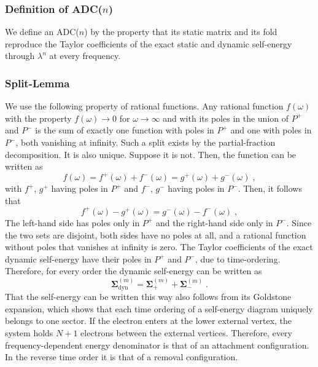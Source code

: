 \documentclass[aip,jcp,reprint,noshowkeys,superscriptaddress]{revtex4-2}
\theoremstyle{plain}
\theoremstyle{definition}
\theoremstyle{remark}
\begin{document}
\subsubsection{Definition of ADC($n$)}
We define an ADC($n$) by the property that its static matrix and its fold reproduce the Taylor coefficients of the exact static and dynamic self-energy through
$\lambda^n$ at every frequency. 

\subsubsection{Split-Lemma}

We use the following property of rational functions. Any rational function $f(\omega)$ with the property $f(\omega) \rightarrow 0$ for $\omega \rightarrow \infty$ and with its poles in the union of $P^+$ and $P^-$ is the sum of exactly one function with poles in $P^+$ and one with poles in $P^-$, both vanishing at infinity. Such a split exists by the partial-fraction decomposition. It is also unique. Suppose it is not. Then, the function can be written as 
\begin{equation}
f(\omega) = f^+(\omega) + f^-(\omega) = g^+(\omega) + g^-(\omega) \;,
\end{equation}
with $f^+$, $g^+$ having poles in $P^+$ and $f^-$, $g^-$ having poles in $P^-$. Then, it follows that 
\begin{equation}
  f^+(\omega) - g^+(\omega) = g^-(\omega) - f^-(\omega) \;, 
\end{equation}
The left-hand side has poles only in $P^+$ and the right-hand side only in $P^-$. Since the two sets are disjoint, both sides have no poles at all, and a rational function without poles that vanishes at infinity is zero. The Taylor coefficients of the exact dynamic self-energy have their poles in $P^+$ and $P^-$, due to time-ordering. Therefore, for every order the dynamic self-energy can be written as 
\begin{equation}
\pmb{\Sigma}^{(m)}_{\mathrm{dyn}}=\pmb{\Sigma}^{(m)}_{+}+\pmb{\Sigma}^{(m)}_{-} \;.
\label{eq:si:pmsplit}
\end{equation}
That the self-energy can be written this way also follows from its Goldstone expansion, which shows that each time ordering of a self-energy diagram uniquely belongs to one sector. If the electron enters at the lower
external vertex, the system holds $N+1$ electrons between the external vertices. Therefore, every frequency-dependent energy denominator is that of an attachment configuration. In the reverse time order it is that of a removal configuration. 
\end{document}
